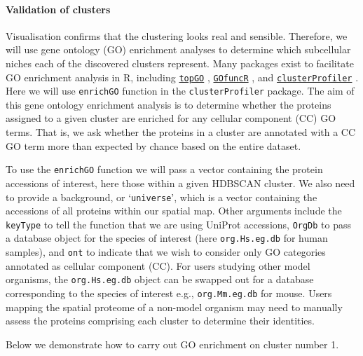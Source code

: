 \documentclass[9pt,a4paper,]{extarticle}
\begin{document}
\paragraph{Validation of clusters}\label{validation-of-clusters}

Visualisation confirms that the clustering looks real and sensible. Therefore,
we will use gene ontology (GO) enrichment analyses to determine which subcellular
niches each of the discovered clusters represent. Many packages exist to facilitate
GO enrichment analysis in R, including
\href{https://bioconductor.org/packages/release/bioc/html/topGO.html}{\texttt{topGO}} \citep{topGO},
\href{https://www.bioconductor.org/packages/release/bioc/html/GOfuncR.html}{\texttt{GOfuncR}} \citep{GofuncR},
and \href{https://bioconductor.org/packages/release/bioc/html/clusterProfiler.html}{\texttt{clusterProfiler}}
\citep{Wu2021}. Here we will use \texttt{enrichGO} function in the \texttt{clusterProfiler} package.
The aim of this gene ontology enrichment analysis is to determine whether the
proteins assigned to a given cluster are enriched for any cellular component (CC)
GO terms. That is, we ask whether the proteins in a cluster are annotated with a
CC GO term more than expected by chance based on the entire dataset.

To use the \texttt{enrichGO} function we will pass a vector containing the protein
accessions of interest, here those within a given HDBSCAN cluster. We also need
to provide a background, or `\texttt{universe}', which is a vector containing the
accessions of all proteins within our spatial map. Other arguments include the
\texttt{keyType} to tell the function that we are using UniProt accessions, \texttt{OrgDb}
to pass a database object for the species of interest (here \texttt{org.Hs.eg.db}
for human samples), and \texttt{ont} to indicate that we wish to consider only GO
categories annotated as cellular component (CC). For users studying other model
organisms, the \texttt{org.Hs.eg.db} object can be swapped out for a database
corresponding to the species of interest e.g., \texttt{org.Mm.eg.db} for mouse. Users
mapping the spatial proteome of a non-model organism may need to manually assess
the proteins comprising each cluster to determine their identities.

Below we demonstrate how to carry out GO enrichment on cluster number 1.
\end{document}

